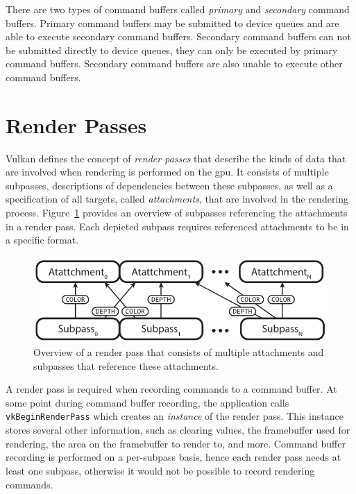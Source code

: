     There are two types of command buffers called \textit{primary} and \textit{secondary} command buffers.
    Primary command buffers may be submitted to device queues and are able to execute secondary command buffers.
    Secondary command buffers can not be submitted directly to device queues, they can only be executed by primary command buffers.
    Secondary command buffers are also unable to execute other command buffers.

  \section{Render Passes}
  \label{sec:RenderPassesOverview}
    Vulkan defines the concept of \textit{render passes} that describe the kinds of data that are involved when rendering is performed on the \gls{gpu}.
    It consists of multiple subpasses, descriptions of dependencies between these subpasses, as well as a specification of all targets, called \textit{attachments}, that are involved in the rendering process.
    Figure~\ref{fig:RenderPassOverview} provides an overview of subpasses referencing the attachments in a render pass.
    Each depicted subpass requires referenced attachments to be in a specific format.

    \begin{figure}
      \centering
      \includegraphics[width=\textwidth]{Main/Images/RenderPassOverview}
      \caption{Overview of a render pass that consists of multiple attachments and subpasses that reference these attachments.}
      \label{fig:RenderPassOverview}
    \end{figure}

    A render pass is required when recording commands to a command buffer.
    At some point during command buffer recording, the application calls \lstinline{vkBeginRenderPass} which creates an \textit{instance} of the render pass.
    This instance stores several other information, such as clearing values, the framebuffer used for rendering, the area on the framebuffer to render to, and more.
    Command buffer recording is performed on a per-subpass basis, hence each render pass needs at least one subpass, otherwise it would not be possible to record rendering commands.

